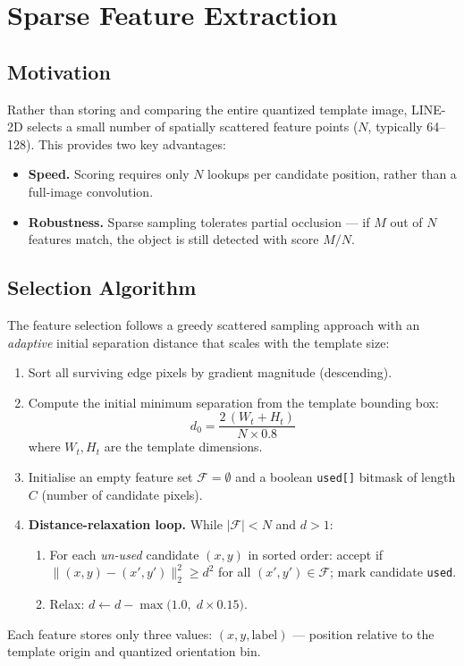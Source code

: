 \documentclass[12pt,a4paper]{article}
\begin{document}
\section{Sparse Feature Extraction}

\subsection{Motivation}
Rather than storing and comparing the entire quantized template image, LINE-2D
selects a small number of spatially scattered feature points ($N$, typically
64--128).  This provides two key advantages:
\begin{itemize}
  \item \textbf{Speed.} Scoring requires only $N$ lookups per candidate position,
        rather than a full-image convolution.
  \item \textbf{Robustness.} Sparse sampling tolerates partial occlusion --- if $M$
        out of $N$ features match, the object is still detected with score $M/N$.
\end{itemize}

\subsection{Selection Algorithm}
The feature selection follows a greedy scattered sampling approach with an
\emph{adaptive} initial separation distance that scales with the template size:
\begin{enumerate}
  \item Sort all surviving edge pixels by gradient magnitude (descending).
  \item Compute the initial minimum separation from the template bounding box:
        \begin{equation}
          d_0 = \frac{2\,(W_t + H_t)}{N \times 0.8}
        \end{equation}
        where $W_t, H_t$ are the template dimensions.
  \item Initialise an empty feature set $\mathcal{F} = \emptyset$ and a boolean
        \texttt{used[]} bitmask of length $C$ (number of candidate pixels).
  \item \textbf{Distance-relaxation loop.}  While $|\mathcal{F}| < N$ and $d > 1$:
        \begin{enumerate}
          \item For each \emph{un-used} candidate $(x,y)$ in sorted order:
                accept if $\|(x,y)-(x',y')\|_2^2 \geq d^2$ for all
                $(x',y') \in \mathcal{F}$; mark candidate \texttt{used}.
          \item Relax: $d \leftarrow d - \max\!\bigl(1.0,\; d \times 0.15\bigr)$.
        \end{enumerate}
\end{enumerate}
Each feature stores only three values: $(x, y, \text{label})$ --- position relative
to the template origin and quantized orientation bin.
\end{document}
